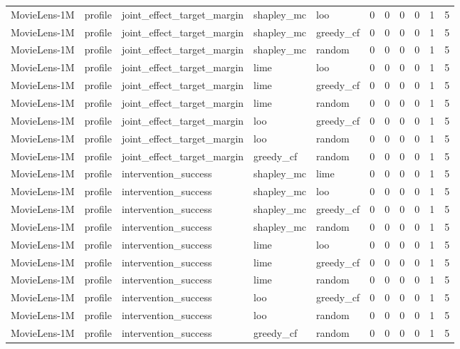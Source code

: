 \begin{table}[t]
{\begin{tabular}{lllllrrrrrr}
MovieLens-1M & profile & joint\_effect\_target\_margin & shapley\_mc & loo & 0 & 0 & 0 & 0 & 1 & 5 \\
MovieLens-1M & profile & joint\_effect\_target\_margin & shapley\_mc & greedy\_cf & 0 & 0 & 0 & 0 & 1 & 5 \\
MovieLens-1M & profile & joint\_effect\_target\_margin & shapley\_mc & random & 0 & 0 & 0 & 0 & 1 & 5 \\
MovieLens-1M & profile & joint\_effect\_target\_margin & lime & loo & 0 & 0 & 0 & 0 & 1 & 5 \\
MovieLens-1M & profile & joint\_effect\_target\_margin & lime & greedy\_cf & 0 & 0 & 0 & 0 & 1 & 5 \\
MovieLens-1M & profile & joint\_effect\_target\_margin & lime & random & 0 & 0 & 0 & 0 & 1 & 5 \\
MovieLens-1M & profile & joint\_effect\_target\_margin & loo & greedy\_cf & 0 & 0 & 0 & 0 & 1 & 5 \\
MovieLens-1M & profile & joint\_effect\_target\_margin & loo & random & 0 & 0 & 0 & 0 & 1 & 5 \\
MovieLens-1M & profile & joint\_effect\_target\_margin & greedy\_cf & random & 0 & 0 & 0 & 0 & 1 & 5 \\
MovieLens-1M & profile & intervention\_success & shapley\_mc & lime & 0 & 0 & 0 & 0 & 1 & 5 \\
MovieLens-1M & profile & intervention\_success & shapley\_mc & loo & 0 & 0 & 0 & 0 & 1 & 5 \\
MovieLens-1M & profile & intervention\_success & shapley\_mc & greedy\_cf & 0 & 0 & 0 & 0 & 1 & 5 \\
MovieLens-1M & profile & intervention\_success & shapley\_mc & random & 0 & 0 & 0 & 0 & 1 & 5 \\
MovieLens-1M & profile & intervention\_success & lime & loo & 0 & 0 & 0 & 0 & 1 & 5 \\
MovieLens-1M & profile & intervention\_success & lime & greedy\_cf & 0 & 0 & 0 & 0 & 1 & 5 \\
MovieLens-1M & profile & intervention\_success & lime & random & 0 & 0 & 0 & 0 & 1 & 5 \\
MovieLens-1M & profile & intervention\_success & loo & greedy\_cf & 0 & 0 & 0 & 0 & 1 & 5 \\
MovieLens-1M & profile & intervention\_success & loo & random & 0 & 0 & 0 & 0 & 1 & 5 \\
MovieLens-1M & profile & intervention\_success & greedy\_cf & random & 0 & 0 & 0 & 0 & 1 & 5 \\

\end{tabular}}
\end{table}
